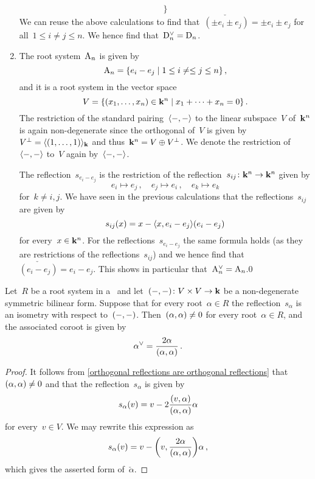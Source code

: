 \begin{example}
\begin{enumerate}
\[        \}
      \]
      We can reuse the above calculations to find that~$\check{(\pm e_i \pm e_j)} = \pm e_i \pm e_j$ for all~$1 \leq i \neq j \leq n$.
      We hence find that~$\check{\rootD_n} = \rootD_n$.
    \item
      The root system~$\mathrm{A}_n$ is given by
      \[
        \rootA_n
        =
        \{
          e_i - e_j
        \suchthat
          1 \leq i \neq \leq j \leq n
        \} \,,
      \]
      and it is a root system in the vector space
      \[
        V
        =
        \{
          (x_1, \dotsc, x_n) \in \kf^n
        \suchthat
          x_1 + \dotsb + x_n = 0
        \} \,.
      \]
      The restriction of the standard pairing~$\langle-,-\rangle$ to the linear subspace~$V$ of~$\mathbf{k}^n$ is again non-degenerate since the orthogonal of~$V$ is given by~$V^\perp = \langle(1, \dotsc, 1)\rangle_{\mathbf{k}}$ and thus~$\mathbf{k}^n = V \oplus V^\perp$.
      We denote the restriction of~$\langle-,-\rangle$ to~$V$ again by~$\langle-,-\rangle$.
      
      The reflection~$s_{e_i - e_j}$ is the restriction of the reflection~$s_{ij} \colon \mathbf{k}^n \to \mathbf{k}^n$ given by
      \[
        e_i
        \mapsto
        e_j \,,
        \quad
        e_j
        \mapsto
        e_i \,,
        \quad
        e_k
        \mapsto
        e_k
      \]
      for~$k \neq i,j$.
      We have seen in the previous calculations that the reflections~$s_{ij}$ are given by
      \[
        s_{ij}(x)
        =
        x - \langle x, e_i - e_j\rangle (e_i - e_j)
      \]
      for every~$x \in \mathbf{k}^n$.
      For the reflections~$s_{e_i - e_j}$ the same formula holds (as they are restrictions of the reflections~$s_{ij}$) and we hence find that~$\check{(e_i - e_j)} = e_i - e_j$.
      This shows in particular that~$\check{\rootA_n} = \rootA_n$.0
  \end{enumerate}
\end{example}


\begin{lemma}
  \label{formula for orthogonal coroots}
  Let~$R$ be a root system in a~{\vectorspace{$\kf$}} and let~$(-,-) \colon V \times V \to \mathbf{k}$ be a non-degenerate symmetric bilinear form.
  Suppose that for every root~$\alpha \in R$ the reflection~$s_\alpha$ is an isometry with respect to~$(-,-)$. 
  Then~$(\alpha, \alpha) \neq 0$ for every root~$\alpha \in R$, and the associated coroot is given by
  \[
    \check{\alpha}
    =
    \frac{2 \alpha}{\inner{\alpha, \alpha}} \,.
  \]
\end{lemma}


\begin{proof}
  
  It follows from \cref{orthogonal reflections are orthogonal reflections} that~$(\alpha, \alpha) \neq 0$ and that the reflection~$s_\alpha$ is given by
  \[
    s_\alpha(v)
    =
    v - 2 \frac{(v,\alpha)}{(\alpha, \alpha)} \alpha
  \]
  for every~$v \in V$.
  We may rewrite this expression as
  \[
    s_\alpha(v)
    =
    v - \inner*{v, \frac{2 \alpha}{\inner{\alpha, \alpha}} } \alpha \,,
  \]
  which gives the asserted form of~$\check{\alpha}$.
\end{proof}


